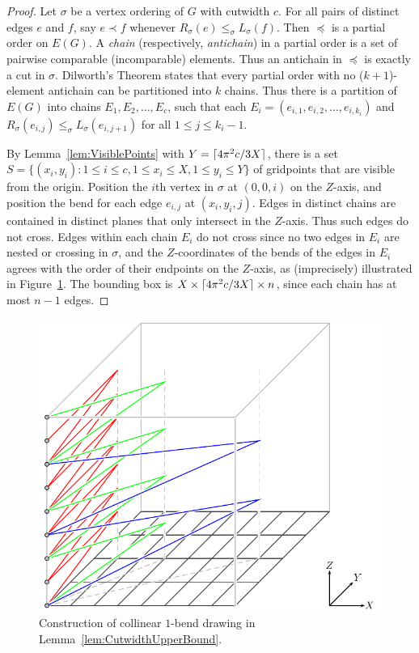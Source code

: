 \documentclass[a4paper]{article}
\newcommand{\ceil}[1]{\ensuremath{\protect\lceil#1\rceil}}
\newcommand{\Figure}[4][htb]{
\begin{figure}[#1]
	\begin{center}#3\end{center}
	\vspace*{-2ex}
	\caption{\figlabel{#2}#4}
\end{figure}
}
\newcommand{\figlabel}[1]{\label{fig:#1}}
\newcommand{\lemref}[1]{Lemma~\ref{lem:#1}}
\newcommand{\figref}[1]{Figure~\ref{fig:#1}}
\theoremstyle{plain}
\begin{document}
\begin{proof} 
Let $\sigma$ be a vertex ordering of $G$ with cutwidth $c$. For all pairs of distinct edges $e$ and $f$, say $e\prec f$ whenever $R_\sigma(e)\leq_\sigma L_\sigma(f)$. Then $\preceq$ is a partial order on $E(G)$. A \emph{chain} (respectively, \emph{antichain}) in a partial order is a set of pairwise comparable (incomparable) elements. Thus an antichain in $\preceq$ is exactly a cut in $\sigma$. Dilworth's Theorem \citep{Dilworth50} states that every partial order with no ($k+1$)-element antichain can be partitioned into $k$ chains. Thus there is a partition of $E(G)$ into chains $E_1,E_2,\dots,E_c$, such that each $E_i=(e_{i,1},e_{i,2},\dots,e_{i,k_i})$ and $R_\sigma(e_{i,j})\leq_\sigma L_\sigma(e_{i,j+1})$ for all $1\leq j\leq k_i-1$.

By \lemref{VisiblePoints} with $Y=\ceil{4\pi^2c/3X}$,  there is a set $S=\{(x_i,y_i):1\leq i\leq c, 1\leq x_i\leq X,1\leq y_i\leq Y\}$ of gridpoints that are visible from the origin. Position the $i$th vertex in $\sigma$ at $(0,0,i)$ on the $Z$-axis, and position the bend for each edge $e_{i,j}$ at $(x_i,y_i,j)$. Edges in distinct chains are contained in distinct planes that only intersect in the $Z$-axis. Thus such edges do not cross. Edges within each chain $E_i$ do not cross since no two edges in $E_i$ are nested or crossing in $\sigma$, and the $Z$-coordinates of the bends of the edges in $E_i$ agrees with the order of their endpoints on the $Z$-axis, as (imprecisely) illustrated in \figref{CutwidthConstruction}. The bounding box is $X\times\ceil{4\pi^2c/3X}\times n$, since each chain has at most $n-1$ edges. \end{proof}

\Figure{CutwidthConstruction}{\includegraphics{CutwidthConstruction}}{Construction of collinear $1$-bend drawing in \lemref{CutwidthUpperBound}.}
\end{document}
